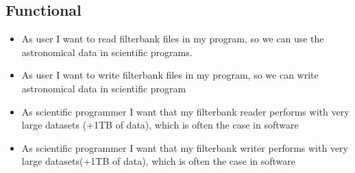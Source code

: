 \documentclass[a4paper,11pt]{report}
\begin{document}
    \subsection{Functional}
    
    \begin{itemize}
        \item As user I want to read filterbank files in my program, so we can use the astronomical data in scientific programs.
        \item As user I want to write filterbank files in my program, so we can write astronomical data in scientific program
        \item As scientific programmer I want that my filterbank reader performs with very large datasets (+1TB of data), which is often the case in software
        \item As scientific programmer I want that my filterbank writer performs with very large datasets(+1TB of data), which is often the case in software
    \end{itemize}
    
    
    
\end{document}
